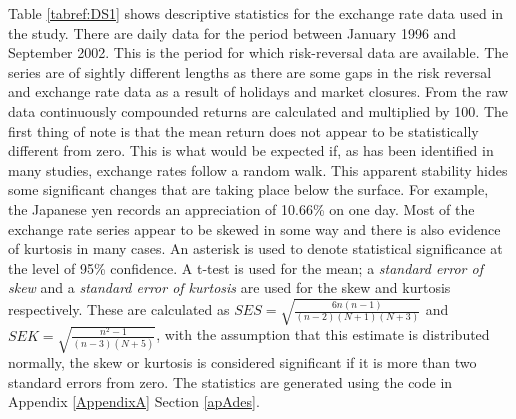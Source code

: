 \documentclass[12pt, a4paper, oneside]{article} %
\begin{document}
Table \ref{tabref:DS1} shows descriptive statistics for the exchange rate data used in the study.  There are daily data for the period between January 1996 and September 2002.  This is the period for which risk-reversal data are available.  The series are of sightly different lengths as there are some gaps in the risk reversal and exchange rate data as a result of holidays and market closures.  From the raw data continuously compounded returns are calculated and multiplied by 100.  The first thing of note is that the mean return does not appear to be statistically different from zero.  This is what would be expected if, as has been identified in many studies, exchange rates follow a random walk. This apparent stability hides some significant changes that are taking place below the surface.  For example, the Japanese yen records an appreciation of 10.66\% on one day.  Most of the exchange rate series appear to be skewed in some way and there is also evidence of kurtosis in many cases.  An asterisk is used to denote statistical significance at the level of 95\% confidence.  A t-test is used for the mean; a \emph{standard error of skew} and a \emph{standard error of kurtosis} are used for the skew and kurtosis respectively.  These are calculated as $SES = \sqrt{\frac{6n(n-1)}{(n-2)(N+1)(N+3)}}$ and $SEK = \sqrt{\frac{n^2-1}{(n-3)(N+5)}}$, with the assumption that this estimate is distributed normally, the skew or kurtosis is considered significant if it is more than two standard errors from zero.     The statistics are generated using the code in Appendix \ref{AppendixA} Section \ref{apAdes}.
\end{document}
